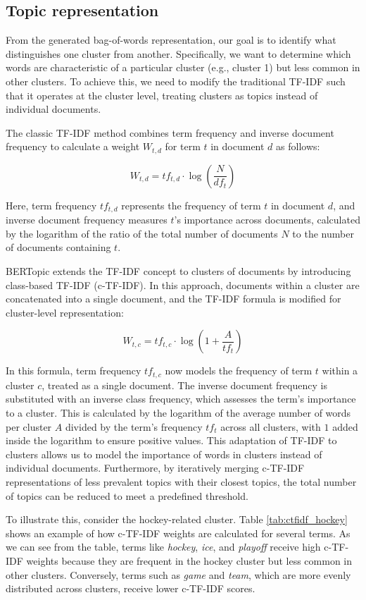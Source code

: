 \subsection{Topic representation}
\label{sec:topic_representation}
From the generated bag-of-words representation, our goal is to identify what distinguishes one cluster from another. Specifically, we want to determine which words are characteristic of a particular cluster (e.g., cluster 1) but less common in other clusters. To achieve this, we need to modify the traditional TF-IDF such that it operates at the cluster level, treating clusters as topics instead of individual documents.

The classic TF-IDF \cite{joachims_probabilistic_1997} method combines term frequency and inverse document frequency to calculate a weight $W_{t,d}$ for term $t$ in document $d$ as follows:

\[ W_{t,d} = tf_{t,d} \cdot \log\left(\frac{N}{df_t}\right) \]

Here, term frequency $tf_{t,d}$ represents the frequency of term $t$ in document $d$, and inverse document frequency measures $t$'s importance across documents, calculated by the logarithm of the ratio of the total number of documents $N$ to the number of documents containing $t$.


BERTopic extends the TF-IDF concept to clusters of documents by introducing class-based TF-IDF (c-TF-IDF). In this approach, documents within a cluster are concatenated into a single document, and the TF-IDF formula is modified for cluster-level representation:

\[ W_{t,c} = tf_{t,c} \cdot \log\left(1 + \frac{A}{tf_t}\right) \]

In this formula, term frequency $tf_{t,c}$ now models the frequency of term $t$ within a cluster $c$, treated as a single document. The inverse document frequency is substituted with an inverse class frequency, which assesses the term's importance to a cluster. This is calculated by the logarithm of the average number of words per cluster $A$ divided by the term's frequency $tf_t$ across all clusters, with $1$ added inside the logarithm to ensure positive values. This adaptation of TF-IDF to clusters allows us to model the importance of words in clusters instead of individual documents. Furthermore, by iteratively merging c-TF-IDF representations of less prevalent topics with their closest topics, the total number of topics can be reduced to meet a predefined threshold.

To illustrate this, consider the hockey-related cluster. Table \ref{tab:ctfidf_hockey} shows an example of how c-TF-IDF weights are calculated for several terms. As we can see from the table, terms like \textit{hockey}, \textit{ice}, and \textit{playoff} receive high c-TF-IDF weights because they are frequent in the hockey cluster but less common in other clusters. Conversely, terms such as \textit{game} and \textit{team}, which are more evenly distributed across clusters, receive lower c-TF-IDF scores.

